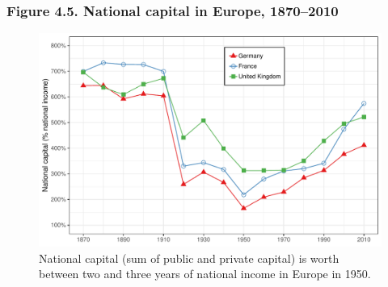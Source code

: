 \documentclass[t]{beamer}\usepackage[]{graphicx}\usepackage[]{color}
\newenvironment{knitrout}{}{} %
\begin{document}
\begin{frame}[label=Figure_4_5]
\frametitle{Figure 4.5. National capital in Europe, 1870--2010}
\begin{figure}[t]
\begin{minipage}[b]{\textwidth}
\centering
\begin{knitrout}\footnotesize
{}\color{fgcolor}

{\centering \includegraphics[width=1\linewidth]{figures/color/Figure_4_5} 

}



\end{knitrout}
\caption{National capital (sum of public and private capital) is worth between two and three years of national income in Europe in 1950.}
\end{minipage}
\end{figure}
\end{frame}
\end{document}
